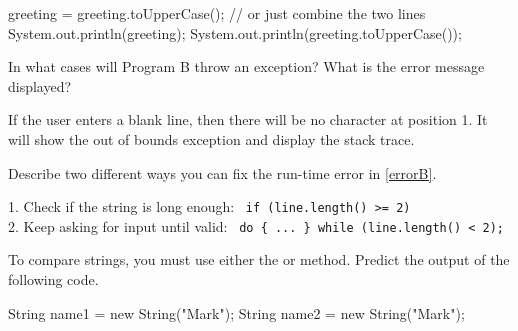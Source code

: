 \begin{answer}
\vspace{-1ex}
\begin{javaans}
greeting = greeting.toUpperCase();   // or just combine the two lines
System.out.println(greeting);        System.out.println(greeting.toUpperCase());
\end{javaans}
\end{answer}


%


\Q \label{errorB}
In what cases will Program B throw an exception? What is the error message displayed?

\begin{answer}
If the user enters a blank line, then there will be no character at position 1. It will show the out of bounds exception and display the stack trace.
\end{answer}


\Q Describe two different ways you can fix the run-time error in \ref{errorB}.

\begin{answer}
1. Check if the string is long enough: ~{\tt if (line.length() >= 2)} \\
2. Keep asking for input until valid: ~{\tt do \{~...~\} while (line.length() < 2);}
\end{answer}


%


\newpage

\Q To compare strings, you must use either the  or  method.
Predict the output of the following code.

\begin{javalst}
String name1 = new String("Mark");
String name2 = new String("Mark");
\end{javalst}


